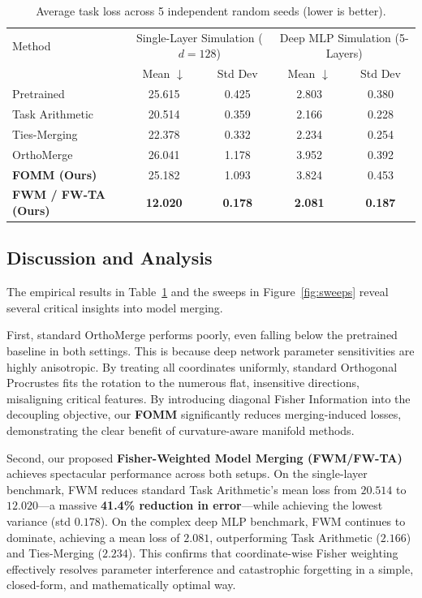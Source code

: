 \documentclass{article}
\theoremstyle{plain}
\theoremstyle{definition}
\theoremstyle{remark}
\begin{document}
\begin{table}[t]
\caption{Average task loss across 5 independent random seeds (lower is better).}
\label{tab:results}
\begin{center}
\begin{small}
\begin{tabular}{lcccc}
\toprule
Method & \multicolumn{2}{c}{Single-Layer Simulation ($d=128$)} & \multicolumn{2}{c}{Deep MLP Simulation (5-Layers)} \\
 & Mean $\downarrow$ & Std Dev & Mean $\downarrow$ & Std Dev \\
\midrule
Pretrained & 25.615 & 0.425 & 2.803 & 0.380 \\
Task Arithmetic & 20.514 & 0.359 & 2.166 & 0.228 \\
Ties-Merging & 22.378 & 0.332 & 2.234 & 0.254 \\
OrthoMerge & 26.041 & 1.178 & 3.952 & 0.392 \\
\midrule
\textbf{FOMM (Ours)} & 25.182 & 1.093 & 3.824 & 0.453 \\
\textbf{FWM / FW-TA (Ours)} & \textbf{12.020} & \textbf{0.178} & \textbf{2.081} & \textbf{0.187} \\
\bottomrule
\end{tabular}
\end{small}
\end{center}
\end{table}

\subsection{Discussion and Analysis}
The empirical results in Table~\ref{tab:results} and the sweeps in Figure~\ref{fig:sweeps} reveal several critical insights into model merging.

First, standard OrthoMerge performs poorly, even falling below the pretrained baseline in both settings. This is because deep network parameter sensitivities are highly anisotropic. By treating all coordinates uniformly, standard Orthogonal Procrustes fits the rotation to the numerous flat, insensitive directions, misaligning critical features. By introducing diagonal Fisher Information into the decoupling objective, our \textbf{FOMM} significantly reduces merging-induced losses, demonstrating the clear benefit of curvature-aware manifold methods.

Second, our proposed \textbf{Fisher-Weighted Model Merging (FWM/FW-TA)} achieves spectacular performance across both setups. On the single-layer benchmark, FWM reduces standard Task Arithmetic's mean loss from $20.514$ to $12.020$---a massive \textbf{41.4\% reduction in error}---while achieving the lowest variance (std $0.178$). On the complex deep MLP benchmark, FWM continues to dominate, achieving a mean loss of $2.081$, outperforming Task Arithmetic ($2.166$) and Ties-Merging ($2.234$). This confirms that coordinate-wise Fisher weighting effectively resolves parameter interference and catastrophic forgetting in a simple, closed-form, and mathematically optimal way.
\end{document}
